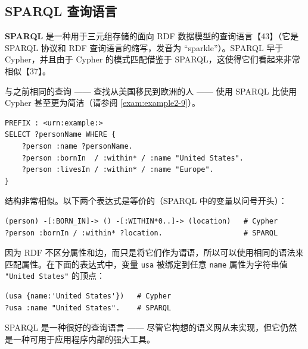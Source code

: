 \subsection{SPARQL 查询语言}

\textbf{SPARQL} 是一种用于三元组存储的面向 RDF 数据模型的查询语言【43】（它是 SPARQL 协议和 RDF 查询语言的缩写，发音为 “sparkle”）。SPARQL 早于 Cypher，并且由于 Cypher 的模式匹配借鉴于 SPARQL，这使得它们看起来非常相似【37】。

与之前相同的查询 —— 查找从美国移民到欧洲的人 —— 使用 SPARQL 比使用 Cypher 甚至更为简洁（请参阅 \autoref{exam:example2-9}）。

\label{exam:example2-9}
\begin{lstlisting}[caption={与示例 2-4 相同的查询，用 SPARQL 表示}]
PREFIX : <urn:example:>
SELECT ?personName WHERE {
    ?person :name ?personName.
    ?person :bornIn  / :within* / :name "United States".
    ?person :livesIn / :within* / :name "Europe".
}
\end{lstlisting}

结构非常相似。以下两个表达式是等价的（SPARQL 中的变量以问号开头）：

\begin{lstlisting}
(person) -[:BORN_IN]-> () -[:WITHIN*0..]-> (location)   # Cypher
?person :bornIn / :within* ?location.                   # SPARQL
\end{lstlisting}

因为 RDF 不区分属性和边，而只是将它们作为谓语，所以可以使用相同的语法来匹配属性。在下面的表达式中，变量 \texttt{usa} 被绑定到任意 \texttt{name} 属性为字符串值 \texttt{"United States"} 的顶点：

\begin{lstlisting}
(usa {name:'United States'})   # Cypher
?usa :name "United States".    # SPARQL
\end{lstlisting}

SPARQL 是一种很好的查询语言 —— 尽管它构想的语义网从未实现，但它仍然是一种可用于应用程序内部的强大工具。


